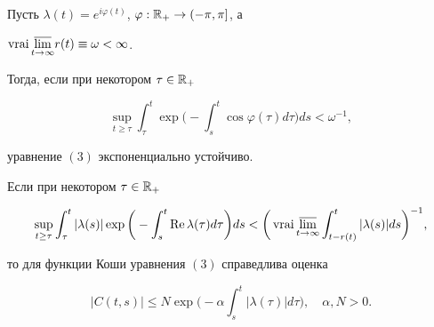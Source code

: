  


\begin{lem}


Пусть $\lambda(t)=e^{i\varphi(t)}$, $\varphi:\Bbb R_+\to(-\pi,\pi]$, а 


$\operatorname{vrai}\underset{t\to\infty}{\varlimsup}r(t)\equiv\omega<\infty$. 


Тогда, если при некотором $\tau\in\Bbb R_+$ 


$$ 


\sup_{t\ge\tau}\int^t_\tau\exp\bigg(-\int^t_s 


\cos\varphi(\tau)d\tau \bigg)d s<\omega^{-1}, 


$$ 


уравнение $(3)$ экспоненциально устойчиво. 


\end{lem} 


 


\begin{lem}


Если при некотором $\tau\in\Bbb R_+$ 


$$ 


\sup_{t\ge\tau}\int^t_\tau|\lambda(s)|\exp 


\bigg(-\int^t_s\re\lambda(\tau)d\tau \bigg)d s< 


\bigg(\vrai\underset{t\to\infty}{\varlimsup} 


\int^t_{t-r(t)}|\lambda(s)|d s\bigg)^{-1}, 


$$ 


то для функции Коши уравнения $(3)$ справедлива оценка 


$$ 


|C(t,s)|\le N\exp\bigg(-\alpha\int^t_s|\lambda(\tau)|d\tau \bigg), 


\quad \alpha,N>0. 


$$ 


\end{lem} 


 


